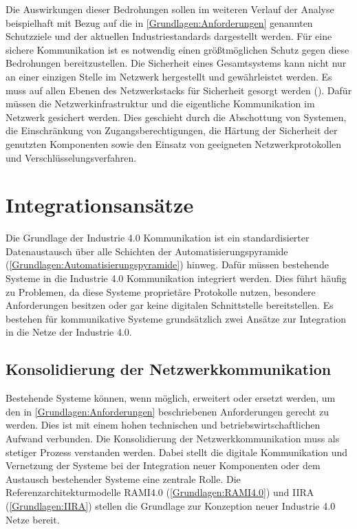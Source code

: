 Die Auswirkungen dieser Bedrohungen sollen im weiteren Verlauf der Analyse beispielhaft mit Bezug auf die in \autoref{Grundlagen:Anforderungen} genannten Schutzziele und der aktuellen Industriestandards dargestellt werden. Für eine sichere Kommunikation ist es notwendig einen größtmöglichen Schutz gegen diese Bedrohungen bereitzustellen. Die Sicherheit eines Gesamtsystems kann nicht nur an einer einzigen Stelle im Netzwerk hergestellt und gewährleistet werden. Es muss auf allen Ebenen des Netzwerkstacks für Sicherheit gesorgt werden (\cite{sichKom2017}). Dafür müssen die Netzwerkinfrastruktur und die eigentliche Kommunikation im Netzwerk gesichert werden. Dies geschieht durch die Abschottung von Systemen, die Einschränkung von Zugangsberechtigungen, die Härtung der Sicherheit der genutzten Komponenten sowie den Einsatz von geeigneten Netzwerkprotokollen und Verschlüsselungsverfahren.

\section{Integrationsansätze}
Die Grundlage der Industrie 4.0 Kommunikation ist ein standardisierter Datenaustausch über alle Schichten der Automatisierungspyramide (\autoref{Grundlagen:Automatisierungspyramide}) hinweg. Dafür müssen bestehende Systeme in die Industrie 4.0 Kommunikation integriert werden. Dies führt häufig zu Problemen, da diese Systeme proprietäre Protokolle nutzen, besondere Anforderungen besitzen oder gar keine digitalen Schnittstelle bereitstellen. Es bestehen für kommunikative Systeme grundsätzlich zwei Ansätze zur Integration in die Netze der Industrie 4.0.

\subsection{Konsolidierung der Netzwerkkommunikation}
Bestehende Systeme können, wenn möglich, erweitert oder ersetzt werden, um den in \autoref{Grundlagen:Anforderungen} beschriebenen Anforderungen gerecht zu werden. Dies ist mit einem hohen technischen und betriebswirtschaftlichen Aufwand verbunden. Die Konsolidierung der Netzwerkkommunikation muss als stetiger Prozess verstanden werden. Dabei stellt die digitale Kommunikation und Vernetzung der Systeme bei der Integration neuer Komponenten oder dem Austausch bestehender Systeme eine zentrale Rolle. Die Referenzarchitekturmodelle \ac{RAMI4.0} (\autoref{Grundlagen:RAMI4.0}) und \ac{IIRA} (\autoref{Grundlagen:IIRA}) stellen die Grundlage zur Konzeption neuer Industrie 4.0 Netze bereit.

